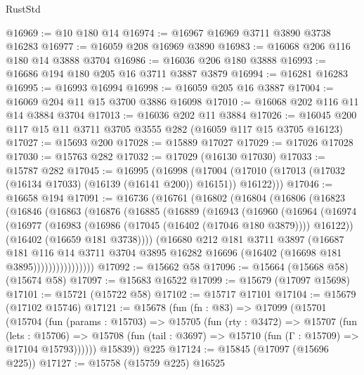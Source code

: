 \begin{lexlean}{RustStd}
\begin{coremodule}
@16969 := @10 @180 @14
@16974 := @16967 @16969 @3711 @3890 @3738 @16283
@16977 := @16059 @208 @16969 @3890
@16983 := @16068 @206 @116 @180 @14 @3888 @3704
@16986 := @16036 @206 @180 @3888
@16993 := @16686 @194 @180 @205 @16 @3711 @3887 @3879
@16994 := @16281 @16283
@16995 := @16993 @16994
@16998 := @16059 @205 @16 @3887
@17004 := @16069 @204 @11 @15 @3700 @3886 @16098
@17010 := @16068 @202 @116 @11 @14 @3884 @3704
@17013 := @16036 @202 @11 @3884
@17026 := @16045 @200 @117 @15 @11 @3711 @3705 @3555 @282 (@16059 @117 @15 @3705 @16123)
@17027 := @15693 @200
@17028 := @15889 @17027
@17029 := @17026 @17028
@17030 := @15763 @282
@17032 := @17029 (@16130 @17030)
@17033 := @15787 @282
@17045 := @16995
    (@16998
      (@17004 (@17010 (@17013 (@17032 (@16134 @17033) (@16139 (@16141 @200)) @16151)) @16122)))
@17046 := @16658 @194
@17091 := @16736
    (@16761
      (@16802
        (@16804
          (@16806
            (@16823
              (@16846
                (@16863
                  (@16876
                    (@16885
                      (@16889
                        (@16943
                          (@16960
                            (@16964
                              (@16974
                                (@16977
                                  (@16983 (@16986 (@17045 (@16402 (@17046 @180 @3879)))) @16122))
                                (@16402 (@16659 @181 @3738))))
                            (@16680
                              @212
                              @181
                              @3711
                              @3897
                              (@16687
                                @181
                                @116
                                @14
                                @3711
                                @3704
                                @3895
                                @16282
                                @16696
                                (@16402 (@16698 @181 @3895))))))))))))))))
@17092 := @15662 @58
@17096 := @15664 (@15668 @58) (@15674 @58)
@17097 := @15683 @16522
@17099 := @15679 (@17097 @15698)
@17101 := @15721 (@15722 @58)
@17102 := @15717 @17101
@17104 := @15679 (@17102 @15746)
@17121 := @15678
    (fun (fn : @83) =>
    @17099
      (@15701
        (@15704
          (fun (params : @15703) =>
          @15705
            (fun (rty : @3472) =>
            @15707
              (fun (lets : @15706) =>
              @15708 (fun (tail : @3697) => @15710 (fun (Γ : @15709) => @17104 @15793))))))
        @15839))
    @225
@17124 := @15845 (@17097 (@15696 @225))
@17127 := @15758 (@15759 @225) @16525

\end{coremodule}
\end{lexlean}
